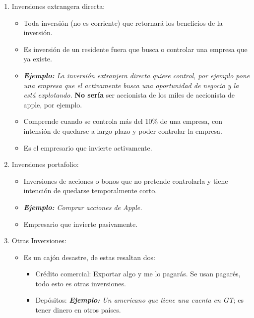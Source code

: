 \begin{enumerate}
    \item Inversiones extrangera directa:
        \begin{itemize}
            \item Toda inversión (no es corriente) que retornará los beneficios de la inversión.
            \item Es inversión de un residente fuera que busca o controlar una empresa que ya existe.
            \item \emph{\textbf{Ejemplo: }La inversión extranjera directa quiere control, por ejemplo pone una empresa que el activamente busca una oportunidad de negocio y la está explotando.} \textbf{No sería} ser accionista de los miles de accionista de apple, por ejemplo.
            \item Comprende cuando se controla más del 10\% de una empresa, con intensión de quedarse a largo plazo y poder controlar la empresa.
            \item Es el empresario que invierte activamente.
        \end{itemize}
    
    \item Inversiones portafolio:
        \begin{itemize}
            \item Inversiones de acciones o bonos que no pretende controlarla y tiene intención de quedarse temporalmente corto.
            \item \emph{\textbf{Ejemplo: }Comprar acciones de Apple.}
            \item Empresario que invierte pasivamente.
        \end{itemize}
    
    \item Otras Inversiones:
        \begin{itemize}
            \item Es un cajón desastre, de estas resaltan dos:
                \begin{itemize}
                    \item Crédito comercial: Exportar algo y me lo pagarás. Se usan pagarés, todo esto es otras inversiones.
                    \item Depósitos: \emph{\textbf{Ejemplo: }Un americano que tiene una cuenta en GT}; es tener dinero en otros países.
                \end{itemize}
        \end{itemize}
\end{enumerate}
